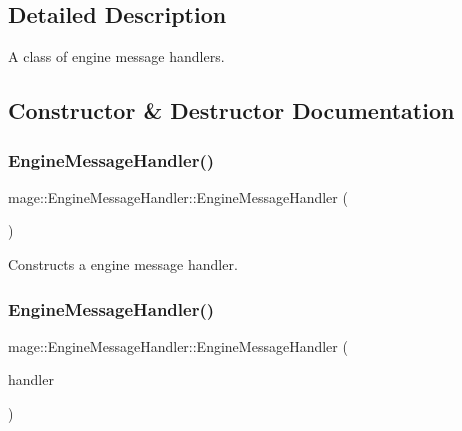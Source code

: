 \subsection{Detailed Description}
A class of engine message handlers. 

\subsection{Constructor \& Destructor Documentation}
\hypertarget{classmage_1_1_engine_message_handler_a1d3e248f3b2b314e5a277a8397f08780}{}\label{classmage_1_1_engine_message_handler_a1d3e248f3b2b314e5a277a8397f08780} 
\subsubsection{\texorpdfstring{Engine\+Message\+Handler()}{EngineMessageHandler()}\hspace{0.1cm}{\footnotesize\ttfamily [1/3]}}
{\footnotesize\ttfamily mage\+::\+Engine\+Message\+Handler\+::\+Engine\+Message\+Handler (\begin{DoxyParamCaption}{ }\end{DoxyParamCaption})\hspace{0.3cm}{\ttfamily [default]}}

Constructs a engine message handler. \hypertarget{classmage_1_1_engine_message_handler_a02124b51211515e5bb93b0a1c3250a8c}{}\label{classmage_1_1_engine_message_handler_a02124b51211515e5bb93b0a1c3250a8c} 
\subsubsection{\texorpdfstring{Engine\+Message\+Handler()}{EngineMessageHandler()}\hspace{0.1cm}{\footnotesize\ttfamily [2/3]}}
{\footnotesize\ttfamily mage\+::\+Engine\+Message\+Handler\+::\+Engine\+Message\+Handler (\begin{DoxyParamCaption}\item[{const \hyperlink{classmage_1_1_engine_message_handler}{Engine\+Message\+Handler} \&}]{handler }\end{DoxyParamCaption})\hspace{0.3cm}{\ttfamily [default]}}

